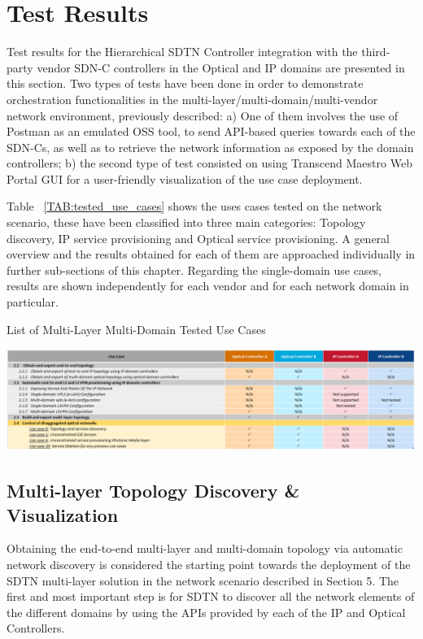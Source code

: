 \documentclass[a4paper,fleqn]{cas-dc}
\begin{document}
\section{Test Results}
\label{section:results}

Test results for the Hierarchical SDTN Controller integration with the third-party vendor SDN-C controllers in the Optical and IP domains are presented in this section. Two types of tests have been done in order to demonstrate orchestration functionalities in the multi-layer/multi-domain/multi-vendor network environment, previously described: a) One of them involves the use of Postman as an emulated OSS tool, to send API-based queries towards each of the SDN-Cs, as well as to retrieve the network information as exposed by the domain controllers; b) the second type of test consisted on using Transcend Maestro Web Portal GUI for a user-friendly visualization of the use case deployment.

Table ~\ref{TAB:tested_use_cases} shows the uses cases tested on the network scenario, these have been classified into three main categories: Topology discovery, IP service provisioning and Optical service provisioning. A general overview and the results obtained for each of them are approached individually in further sub-sections of this chapter. Regarding the single-domain use cases, results are shown independently for each vendor and for each network domain in particular.

\begin{table}
	\caption{List of Multi-Layer Multi-Domain Tested Use Cases}
	\centering
		\includegraphics[scale=0.5]{figs/tested_use_cases.png}
	\label{TAB:tested_use_cases}
\end{table}

\subsection{Multi-layer Topology Discovery \& Visualization}
Obtaining the end-to-end multi-layer and multi-domain topology via automatic network discovery is considered the starting point towards the deployment of the SDTN multi-layer solution in the network scenario described in Section 5. The first and most important step is for SDTN to discover all the network elements of the different domains by using the APIs provided by each of the IP and Optical Controllers. 
\end{document}

